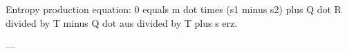 Entropy production equation:  
0 equals m dot times (s1 minus s2) plus Q dot R divided by T minus Q dot aus divided by T plus s erz.  

---
